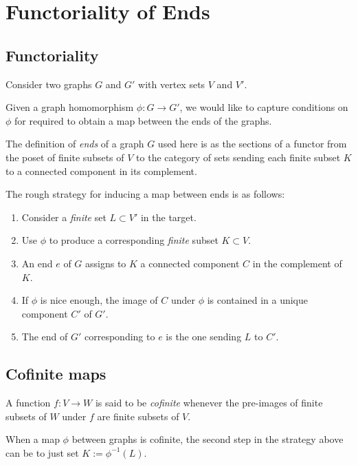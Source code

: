 \chapter{Functoriality of Ends}

\section{Functoriality}

Consider two graphs $G$ and $G'$ with vertex sets $V$ and $V'$.

Given a graph homomorphism $\phi : G \to G'$, we would like to capture conditions on $\phi$ for required to obtain a map between the ends of the graphs.

The definition of \emph{ends} of a graph $G$ used here is as the sections of a functor from the poset of finite subsets of $V$ to the category of sets sending each finite subset $K$ to a connected component in its complement.

The rough strategy for inducing a map between ends is as follows:
\begin{enumerate}
    \item Consider a \emph{finite} set $L \subset V'$ in the target.
    \item Use $\phi$ to produce a corresponding \emph{finite} subset $K \subset V$.
    \item An end $e$ of $G$ assigns to $K$ a connected component $C$ in the complement of $K$.
    \item If $\phi$ is nice enough, the image of $C$ under $\phi$ is contained in a unique component $C'$ of $G'$.
    \item The end of $G'$ corresponding to $e$ is the one sending $L$ to $C'$.
\end{enumerate}

\section{Cofinite maps}

\begin{definition}
    \label{def:cofinite_map}
    A function $f : V \to W$ is said to be \emph{cofinite} whenever the pre-images of finite subsets of $W$ under $f$ are finite subsets of $V$.
\end{definition}
  
When a map $\phi$ between graphs is cofinite, the second step in the strategy above can be to just set $K := \phi^{-1}(L)$.

